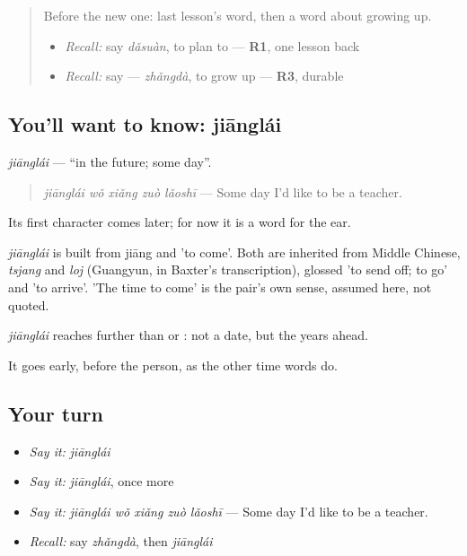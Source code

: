 \label{lesson:ZH-C148-jianglai}



\begin{quote}
Before the new one: last lesson's word, then a word about growing up.

\begin{itemize}
\raggedright
  \item \emph{Recall:} say \emph{dǎsuàn}, to plan to — \textbf{R1}, one lesson back
  \item \emph{Recall:} say  — \emph{zhǎngdà}, to grow up — \textbf{R3}, durable
\end{itemize}
\end{quote}

\subsection*{You'll want to know: jiānglái}
\emph{jiānglái} — \textquotedblleft{}in the future; some day\textquotedblright{}.

\begin{quote}
\emph{jiānglái wǒ xiǎng zuò lǎoshī} — Some day I'd like to be a teacher.
\end{quote}

Its first character comes later; for now it is a word for the ear.

\begin{cousinweb}
\emph{jiānglái} is built from jiāng and  'to come'. Both are inherited from Middle Chinese, \emph{tsjang} and \emph{loj} (Guangyun, in Baxter's transcription), glossed 'to send off; to go' and 'to arrive'. 'The time to come' is the pair's own sense, assumed here, not quoted.
\end{cousinweb}

\begin{grammarlens}[title={What you've built}]
\emph{jiānglái} reaches further than  or : not a date, but the years ahead.

It goes early, before the person, as the other time words do.
\end{grammarlens}

\subsection*{Your turn}
\begin{itemize}
\raggedright
  \item \emph{Say it:} \emph{jiānglái}
  \item \emph{Say it:} \emph{jiānglái}, once more
  \item \emph{Say it:} \emph{jiānglái wǒ xiǎng zuò lǎoshī} — Some day I'd like to be a teacher.
  \item \emph{Recall:} say \emph{zhǎngdà}, then \emph{jiānglái}
\end{itemize}

